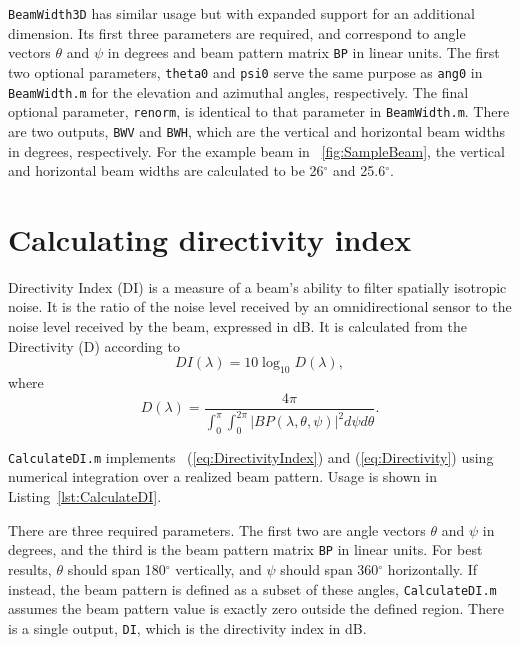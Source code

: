 \texttt{BeamWidth3D} has similar usage but with expanded support for an additional dimension. Its first three parameters are required, and correspond to angle vectors $\theta$ and $\psi$ in degrees and beam pattern matrix \texttt{BP} in linear units. The first two optional parameters, \texttt{theta0} and \texttt{psi0} serve the same purpose as \texttt{ang0} in \texttt{BeamWidth.m} for the elevation and azimuthal angles, respectively. The final optional parameter, \texttt{renorm}, is identical to that parameter in \texttt{BeamWidth.m}. There are two outputs, \texttt{BWV} and \texttt{BWH}, which are the vertical and horizontal beam widths in degrees, respectively. For the example beam in \figname~\ref{fig:SampleBeam}, the vertical and horizontal beam widths are calculated to be 26$^\circ$ and 25.6$^\circ$.

\section{Calculating directivity index}

Directivity Index (DI) is a measure of a beam's ability to filter spatially isotropic noise. It is the ratio of the noise level received by an omnidirectional sensor to the noise level received by the beam, expressed in dB. It is calculated from the Directivity (D) according to
\begin{equation}
DI(\lambda) = 10\log_{10}D(\lambda),\label{eq:DirectivityIndex}
\end{equation}
where
\begin{equation}
D(\lambda) = \frac{4\pi}{\int_0^{\pi}\int_0^{2\pi}|BP(\lambda,\theta,\psi)|^2d\psi{d\theta}}.\label{eq:Directivity}
\end{equation}

\texttt{CalculateDI.m} implements \eqnnames~(\ref{eq:DirectivityIndex}) and (\ref{eq:Directivity}) using numerical integration over a realized beam pattern. Usage is shown in Listing~\ref{lst:CalculateDI}.

There are three required parameters. The first two are angle vectors $\theta$ and $\psi$ in degrees, and the third is the beam pattern matrix \texttt{BP} in linear units. For best results, $\theta$ should span 180$^\circ$ vertically, and $\psi$ should span 360$^\circ$ horizontally. If instead, the beam pattern is defined as a subset of these angles, \texttt{CalculateDI.m} assumes the beam pattern value is exactly zero outside the defined region. There is a single output, \texttt{DI}, which is the directivity index in dB.

